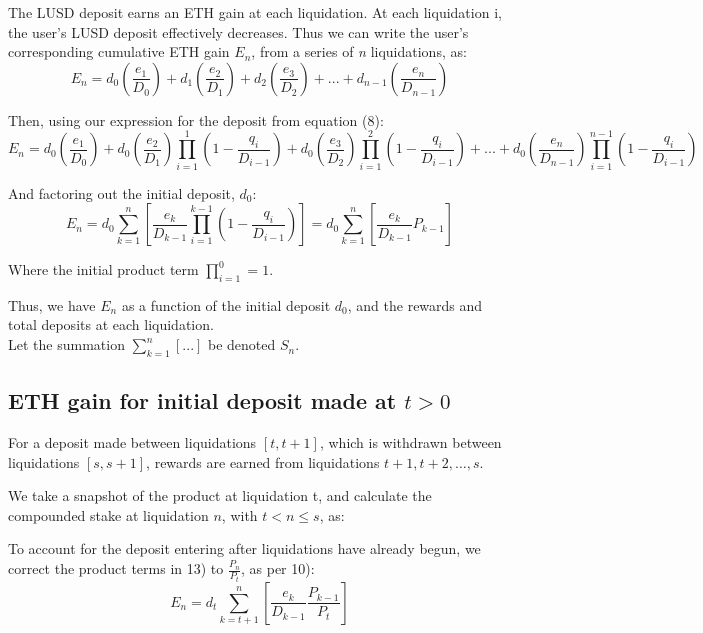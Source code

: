 \documentclass[reqno]{article}
\begin{document}
\bigskip
The LUSD deposit earns an ETH gain at each liquidation.
At each liquidation i, the user’s LUSD deposit effectively decreases. Thus we can write the
user’s corresponding cumulative ETH gain $E_{n}$, from a series of \textit{n} liquidations, as:
\begin{equation} 
E_n=d_0\left(\frac{e_1}{D_0}\right)+d_1\left(\frac{e_2}{D_1}\right)+d_2\left(\frac{e_3}{D_2}\right)+...+d_{n-1}\left(\frac{e_n}{D_{n-1}}\right)
\end{equation}

\bigskip
Then, using our expression for the deposit from equation (8):
\begin{equation} 
E_n=d_0\left(\frac{e_1}{D_0}\right)+d_0\left(\frac{e_2}{D_1}\right)\prod^1_{i=1}\left(1-\frac{q_i}{D_{i-1}}\right)+d_0\left(\frac{e_3}{D_2}\right)\prod^2_{i=1}\left(1-\frac{q_i}{D_{i-1}}\right)+...+d_0\left(\frac{e_n}{D_{n-1}}\right)\prod^{n-1}_{i=1}\left(1-\frac{q_i}{D_{i-1}}\right)
\end{equation}

\bigskip
And factoring out the initial deposit, $d_0$:
\begin{equation} 
    E_n=d_0\sum^n_{k=1}\left[\frac{e_k}{D_{k-1}}\prod^{k-1}_{i=1}\left(1-\frac{q_i}{D_{i-1}}\right)\right] = d_0\sum^n_{k=1}\left[\frac{e_k}{D_{k-1}}P_{k-1}\right]
\end{equation}

\bigskip
Where the initial product term $\displaystyle\prod^0_{i=1}=1$.

\bigskip
Thus, we have $E_n$ as a function of the initial deposit $d_0$, and the rewards and total deposits at each liquidation.\\
Let the summation $\displaystyle\sum^n_{k=1}[...]$ be denoted $S_n$.

\bigskip
\subsection{ETH gain for initial deposit made at $t>0$}

\bigskip
For a deposit made between liquidations $[t, t+1]$, which is withdrawn between liquidations $[s, s+1]$, rewards are earned from liquidations $t+1, t+2, \ldots, s$.

We take a snapshot of the product at liquidation t, and calculate the compounded stake at liquidation $n$, with $t < n \leq s$, as:

\bigskip
To account for the deposit entering after liquidations have already begun, we correct the product terms in 13) to $\frac{P_n}{P_t}$, as per 10):
\begin{equation} 
    E_n = d_t\sum^n_{k=t+1}\left[\frac{e_k}{D_{k-1}}\frac{P_{k-1}}{P_t}\right]
\end{equation}
\end{document}
